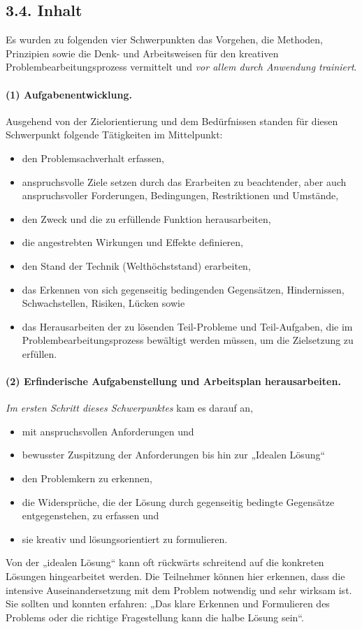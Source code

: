 \documentclass[11pt,a4paper]{article}
\begin{document}
\subsection*{3.4. Inhalt}   
Es wurden zu folgenden vier Schwerpunkten das Vorgehen, die Methoden,
Prinzipien sowie die Denk- und Arbeitsweisen für den kreativen
Problembearbeitungsprozess vermittelt und \emph{vor allem durch Anwendung
trainiert}.

\paragraph{(1) Aufgabenentwicklung.}
Ausgehend von der Zielorientierung und dem Bedürfnissen standen für diesen
Schwerpunkt folgende Tätigkeiten im Mittelpunkt:
\begin{itemize}
\item den Problemsachverhalt erfassen,
\item anspruchsvolle Ziele setzen durch das Erarbeiten zu beachtender, aber
  auch anspruchsvoller Forderungen, Bedingungen, Restriktionen und Umstände,
\item den Zweck und die zu erfüllende Funktion herausarbeiten,
\item die angestrebten Wirkungen und Effekte definieren,
\item den Stand der Technik (Welthöchststand) erarbeiten,
\item das Erkennen von sich gegenseitig bedingenden Gegensätzen, Hindernissen,
  Schwachstellen, Risiken, Lücken sowie
\item das Herausarbeiten der zu lösenden Teil-Probleme und Teil-Aufgaben, die
  im Problembearbeitungsprozess bewältigt werden müssen, um die Zielsetzung zu
  erfüllen.
\end{itemize}

\paragraph{(2) Erfinderische Aufgabenstellung und Arbeitsplan herausarbeiten.}
\emph{Im ersten Schritt dieses Schwerpunktes} kam es darauf an,
\begin{itemize}
\item mit anspruchsvollen Anforderungen und
\item bewusster Zuspitzung der Anforderungen bis hin zur „Idealen Lösung“
\item den Problemkern zu erkennen,
\item die Widersprüche, die der Lösung durch gegenseitig bedingte Gegensätze
  entgegenstehen, zu erfassen und
\item sie kreativ und lösungsorientiert zu formulieren.
\end{itemize}
Von der „idealen Lösung“ kann oft rückwärts schreitend auf die konkreten
Lösungen hingearbeitet werden. Die Teilnehmer können hier erkennen, dass die
intensive Auseinandersetzung mit dem Problem notwendig und sehr wirksam ist.
Sie sollten und konnten erfahren: „Das klare Erkennen und Formulieren des
Problems oder die richtige Fragestellung kann die halbe Lösung sein“.
\end{document}
